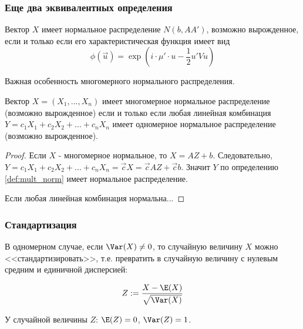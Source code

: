 \subsubsection*{Еще два эквивалентных определения}


\begin{myth}
Вектор $X$ имеет нормальное распределение $N(b,AA')$, возможно вырожденное, если и только если его характеристическая функция имеет вид 
\begin{equation}
\phi(\vec{u})=\exp\left(i\cdot \mu'\cdot u-\frac{1}{2}u'Vu \right)
\end{equation}

\end{myth}



Важная особенность многомерного нормального распределения.

\begin{myth} \label{th:normal_one2mult}
Вектор $X=(X_{1},...,X_{n})$ имеет многомерное нормальное распределение (возможно вырожденное) если и только если любая линейная комбинация $Y=c_{1}X_{1}+c_{2}X_{2}+...+c_{n}X_{n}$ имеет одномерное нормальное распределение (возможно вырожденное).
\end{myth}

\begin{proof}
Если $X$ - многомерное нормальное, то $X=AZ+b$. Следовательно, $Y=c_{1}X_{1}+c_{2}X_{2}+...+c_{n}X_{n}=\vec{c}X=\vec{c}AZ+\vec{c}b$. Значит $Y$ по определению \ref{def:mult_norm} имеет нормальное распределение.

Если любая линейная комбинация нормальна...

\end{proof}






\subsubsection*{Стандартизация}

В одномерном случае, если $\Var(X)\neq 0$, то случайную величину $X$ можно <<стандартизировать>>, т.е. превратить в случайную величину с нулевым средним и единичной дисперсией: 

\begin{equation}
Z:=\frac{X-\E(X)}{\sqrt{\Var(X)}}
\end{equation}

У случайной величины $Z$: $\E(Z)=0$, $\Var(Z)=1$.

